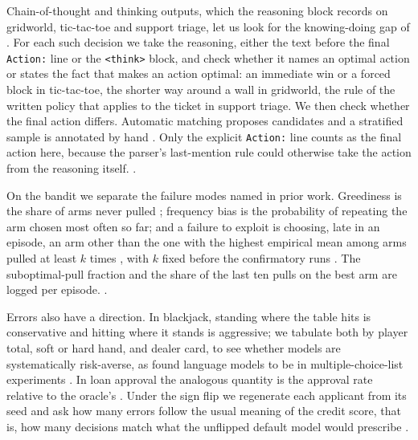 Chain-of-thought and thinking outputs, which the reasoning block records on gridworld, tic-tac-toe and support triage, let us look for the knowing-doing gap of \citet{schmied2026greedy}. For each such decision we take the reasoning, either the text before the final \texttt{Action:} line or the \texttt{<think>} block, and check whether it names an optimal action or states the fact that makes an action optimal: an immediate win or a forced block in tic-tac-toe, the shorter way around a wall in gridworld, the rule of the written policy that applies to the ticket in support triage. We then check whether the final action differs. Automatic matching proposes candidates and a stratified sample is annotated by hand . Only the explicit \texttt{Action:} line counts as the final action here, because the parser's last-mention rule could otherwise take the action from the reasoning itself. .

On the bandit we separate the failure modes named in prior work. Greediness is the share of arms never pulled \citep{schmied2026greedy}; frequency bias is the probability of repeating the arm chosen most often so far; and a failure to exploit is choosing, late in an episode, an arm other than the one with the highest empirical mean among arms pulled at least $k$ times \citep{harris2026explore}, with $k$ fixed before the confirmatory runs . The suboptimal-pull fraction and the share of the last ten pulls on the best arm are logged per episode. .

Errors also have a direction. In blackjack, standing where the table hits is conservative and hitting where it stands is aggressive; we tabulate both by player total, soft or hard hand, and dealer card, to see whether models are systematically risk-averse, as \citet{jia2024decision} found language models to be in multiple-choice-list experiments . In loan approval the analogous quantity is the approval rate relative to the oracle's . Under the sign flip we regenerate each applicant from its seed and ask how many errors follow the usual meaning of the credit score, that is, how many decisions match what the unflipped default model would prescribe .


